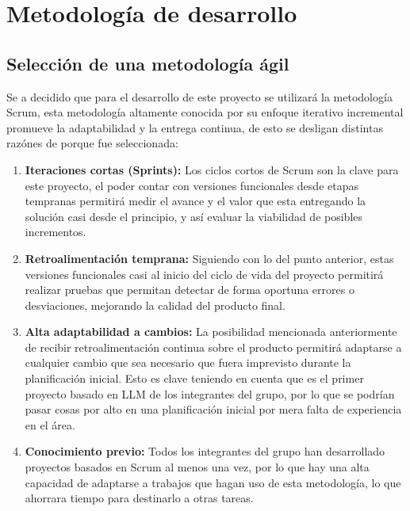 \section{Metodología de desarrollo}

\subsection{Selección de una metodología ágil}

Se a decidido que para el desarrollo de este proyecto se utilizará la metodología Scrum, esta metodología altamente conocida por su enfoque iterativo incremental promueve la adaptabilidad y la entrega continua, de esto se desligan distintas razónes de porque fue seleccionada:

\begin{enumerate}
    
    \item \textbf{Iteraciones cortas (Sprints):} Los ciclos cortos de Scrum son la clave para este proyecto, el poder contar con versiones funcionales desde etapas tempranas permitirá medir el avance y el valor que esta entregando la solución casi desde el principio, y así evaluar la viabilidad de posibles incrementos.

    \item \textbf{Retroalimentación temprana:} Siguiendo con lo del punto anterior, estas versiones funcionales casi al inicio del ciclo de vida del proyecto permitirá realizar pruebas que permitan detectar de forma oportuna errores o desviaciones, mejorando la calidad del producto final.
    
    \item \textbf{Alta adaptabilidad a cambios:} La posibilidad mencionada anteriormente de recibir retroalimentación continua sobre el producto permitirá adaptarse a cualquier cambio que sea necesario que fuera imprevisto durante la planificación inicial. Esto es clave teniendo en cuenta que es el primer proyecto basado en LLM de los integrantes del grupo, por lo que se podrían pasar cosas por alto en una planificación inicial por mera falta de experiencia en el área.
    
    \item \textbf{Conocimiento previo:} Todos los integrantes del grupo han desarrollado proyectos basados en Scrum al menos una vez, por lo que hay una alta capacidad de adaptarse a trabajos que hagan uso de esta metodología, lo que ahorrara tiempo para destinarlo a otras tareas.
\end{enumerate}


